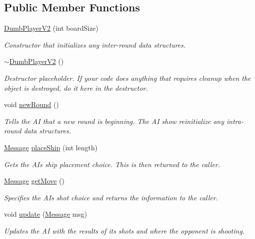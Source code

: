 \subsection*{Public Member Functions}
\begin{DoxyCompactItemize}
\item 
\hyperlink{classDumbPlayerV2_af19f38c65f8a0ebc19665667be54e1b4}{Dumb\+Player\+V2} (int board\+Size)
\begin{DoxyCompactList}\small\item\em Constructor that initializes any inter-\/round data structures. \end{DoxyCompactList}\item 
\hyperlink{classDumbPlayerV2_ae43353dc5fec8a7b3149daca75141966}{$\sim$\+Dumb\+Player\+V2} ()\hypertarget{classDumbPlayerV2_ae43353dc5fec8a7b3149daca75141966}{}\label{classDumbPlayerV2_ae43353dc5fec8a7b3149daca75141966}

\begin{DoxyCompactList}\small\item\em Destructor placeholder. If your code does anything that requires cleanup when the object is destroyed, do it here in the destructor. \end{DoxyCompactList}\item 
void \hyperlink{classDumbPlayerV2_ae7c2704abc026cf6ca36afbd7bce5e23}{new\+Round} ()\hypertarget{classDumbPlayerV2_ae7c2704abc026cf6ca36afbd7bce5e23}{}\label{classDumbPlayerV2_ae7c2704abc026cf6ca36afbd7bce5e23}

\begin{DoxyCompactList}\small\item\em Tells the AI that a new round is beginning. The AI show reinitialize any intra-\/round data structures. \end{DoxyCompactList}\item 
\hyperlink{classMessage}{Message} \hyperlink{classDumbPlayerV2_a49d3990b3423204c1a367cf71bdb9605}{place\+Ship} (int length)
\begin{DoxyCompactList}\small\item\em Gets the AI\textquotesingle{}s ship placement choice. This is then returned to the caller. \end{DoxyCompactList}\item 
\hyperlink{classMessage}{Message} \hyperlink{classDumbPlayerV2_a1e28ee8b3b05ce9188a276028ef9b424}{get\+Move} ()
\begin{DoxyCompactList}\small\item\em Specifies the AI\textquotesingle{}s shot choice and returns the information to the caller. \end{DoxyCompactList}\item 
void \hyperlink{classDumbPlayerV2_a9e91bb555844a7a1ec60edfffcb1be76}{update} (\hyperlink{classMessage}{Message} msg)
\begin{DoxyCompactList}\small\item\em Updates the AI with the results of its shots and where the opponent is shooting. \end{DoxyCompactList}\end{DoxyCompactItemize}
